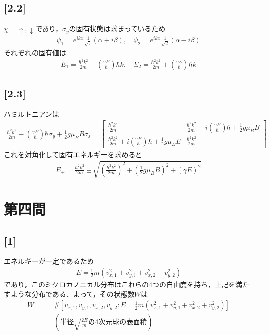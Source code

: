 \documentclass[12pt,dvipdfmx]{jsarticle}
\begin{document}
\subsection*{\large{[2.2]}}
$\chi = \uparrow,\downarrow$であり，$\sigma_y$の固有状態は求まっているため
\begin{eqnarray}
  \psi_1 = e^{ikx}\frac{1}{\sqrt{2}}(\alpha +i \beta), \quad \psi_2 = e^{ikx}\frac{1}{\sqrt{2}}(\alpha -i \beta)
\end{eqnarray}
それぞれの固有値は
\begin{eqnarray}
  E_1= \frac{\hbar^2k^2}{2m} - \left(  \frac{\gamma E}{\hbar}\right)\hbar k , \quad E_2 = \frac{\hbar^2k^2}{2m} + \left(  \frac{\gamma E}{\hbar}\right)\hbar k 
\end{eqnarray}
\subsection*{\large{[2.3]}}
ハミルトニアンは
\begin{eqnarray}
  \frac{\hbar^2 k^2}{2m} - \left(  \frac{\gamma E}{\hbar}\right)\hbar\sigma_y + \frac{1}{2}g\mu_B B\sigma_x=
  \begin{bmatrix}
    \frac{\hbar^2 k^2}{2m} & \frac{\hbar^2 k^2}{2m} - i\left(  \frac{\gamma E}{\hbar}\right)\hbar + \frac{1}{2}g\mu_B B\\
    \frac{\hbar^2 k^2}{2m} + i\left(  \frac{\gamma E}{\hbar}\right)\hbar + \frac{1}{2}g\mu_B B & \frac{\hbar^2 k^2}{2m}
  \end{bmatrix}
\end{eqnarray}
これを対角化して固有エネルギーを求めると
\begin{eqnarray}
  E_{\pm} = \frac{\hbar^2 k^2 }{2m} \pm \sqrt{ \left(\frac{\hbar^2 k^2 }{2m} \right)^2 + \left(\frac{1}{2}g\mu_B B\right)^2 + \left(\gamma E\right)^2 }
\end{eqnarray}

\newpage

\section*{\Large{第四問}}
\subsection*{\large{[1]}}
エネルギーが一定であるため
\begin{eqnarray}
  E = \frac{1}{2}m\left( v_{x,1}^2 + v_{y,1}^2 + v_{x,2}^2 + v_{y,2}^2 \right)
\end{eqnarray}
であり，このミクロカノニカル分布はこれらの4つの自由度を持ち，上記を満たすような分布である．よって，その状態数$W$は
\begin{eqnarray}
  W &&= \# \left[ v_{x,1},v_{y,1},v_{x,2},v_{y,2} : E = \frac{1}{2}m\left( v_{x,1}^2 + v_{y,1}^2 + v_{x,2}^2 + v_{y,2}^2 \right) \right]\\
  &&=\left( 半径 \sqrt{\frac{2E}{m}}の4次元球の表面積 \right)
\end{eqnarray}
\end{document}

